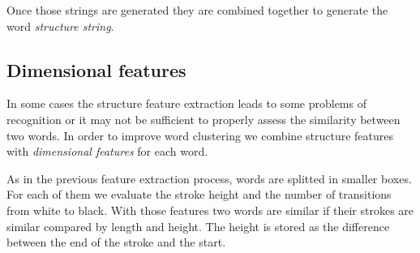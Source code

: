 Once those strings are generated they are combined together to generate the word \textit{structure string}. 

\subsection{Dimensional features}

In some cases the structure feature extraction leads to some problems of recognition or it may not be sufficient to properly assess the similarity between two words.
In order to improve word clustering we combine structure features with \emph{dimensional features} for each word. 

As in the previous feature extraction process, words are splitted in smaller boxes. For each of them we evaluate the stroke height and the number of transitions from white to black. With those features two words are similar if their strokes are similar compared by length and height. The height is stored as the difference between the end of the stroke and the start.
